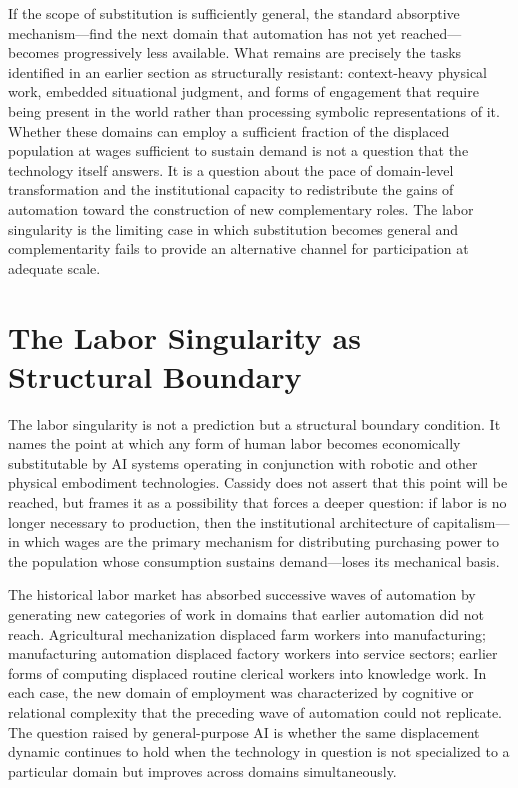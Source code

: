 \documentclass[11pt, a4paper]{article}
\theoremstyle{plain}
\theoremstyle{definition}
\begin{document}
If the scope of substitution is sufficiently general, the standard absorptive
mechanism---find the next domain that automation has not yet reached---becomes
progressively less available. What remains are precisely the tasks identified
in an earlier section as structurally resistant: context-heavy physical work,
embedded situational judgment, and forms of engagement that require being
present in the world rather than processing symbolic representations of it.
Whether these domains can employ a sufficient fraction of the displaced
population at wages sufficient to sustain demand is not a question that the
technology itself answers. It is a question about the pace of domain-level
transformation and the institutional capacity to redistribute the gains of
automation toward the construction of new complementary roles. The labor
singularity is the limiting case in which substitution becomes general and
complementarity fails to provide an alternative channel for participation
at adequate scale.

\section{The Labor Singularity as Structural Boundary}

The labor singularity is not a prediction but a structural boundary condition.
It names the point at which any form of human labor becomes economically
substitutable by AI systems operating in conjunction with robotic and other
physical embodiment technologies. Cassidy does not assert that this point will
be reached, but frames it as a possibility that forces a deeper question: if
labor is no longer necessary to production, then the institutional architecture
of capitalism---in which wages are the primary mechanism for distributing
purchasing power to the population whose consumption sustains demand---loses
its mechanical basis.

The historical labor market has absorbed successive waves of automation by
generating new categories of work in domains that earlier automation did not
reach. Agricultural mechanization displaced farm workers into manufacturing;
manufacturing automation displaced factory workers into service sectors; earlier
forms of computing displaced routine clerical workers into knowledge work. In
each case, the new domain of employment was characterized by cognitive or
relational complexity that the preceding wave of automation could not replicate.
The question raised by general-purpose AI is whether the same displacement
dynamic continues to hold when the technology in question is not specialized
to a particular domain but improves across domains simultaneously.
\end{document}
